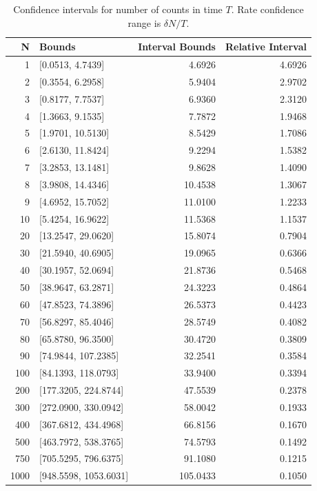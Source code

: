 \documentclass{article}
\begin{document}
\begin{table}
    \begin{tabular}{r|l|r|r}
     \hline
N & Bounds & Interval Bounds & Relative Interval\\ 
\hline 
1 &  [0.0513, 4.7439] & 4.6926 & 4.6926\\ 
2 &  [0.3554, 6.2958] & 5.9404 & 2.9702\\ 
3 &  [0.8177, 7.7537] & 6.9360 & 2.3120\\ 
4 &  [1.3663, 9.1535] & 7.7872 & 1.9468\\ 
5 &  [1.9701, 10.5130] & 8.5429 & 1.7086\\ 
6 &  [2.6130, 11.8424] & 9.2294 & 1.5382\\ 
7 &  [3.2853, 13.1481] & 9.8628 & 1.4090\\ 
8 &  [3.9808, 14.4346] & 10.4538 & 1.3067\\ 
9 &  [4.6952, 15.7052] & 11.0100 & 1.2233\\ 
10 &  [5.4254, 16.9622] & 11.5368 & 1.1537\\ 
20 &  [13.2547, 29.0620] & 15.8074 & 0.7904\\ 
30 & [21.5940, 40.6905] & 19.0965 & 0.6366\\ 
40 & [30.1957, 52.0694] & 21.8736 & 0.5468\\ 
50 & [38.9647, 63.2871] & 24.3223 & 0.4864\\ 
60 & [47.8523, 74.3896] & 26.5373 & 0.4423\\ 
70 & [56.8297, 85.4046] & 28.5749 & 0.4082\\ 
80 & [65.8780, 96.3500] & 30.4720 & 0.3809\\ 
90 & [74.9844, 107.2385] & 32.2541 & 0.3584\\ 
100 & [84.1393, 118.0793] & 33.9400 & 0.3394\\ 
200 & [177.3205, 224.8744] & 47.5539 & 0.2378\\ 
300 & [272.0900, 330.0942] & 58.0042 & 0.1933\\ 
400 & [367.6812, 434.4968] & 66.8156 & 0.1670\\ 
500 & [463.7972, 538.3765] & 74.5793 & 0.1492\\ 
750 & [705.5295, 796.6375] & 91.1080 & 0.1215\\ 
1000 & [948.5598, 1053.6031] & 105.0433 & 0.1050\\ 
\end{tabular}
\caption{Confidence intervals for number of counts in time $T$.  Rate confidence range is $\delta N/T$.}
\label{tab:conf}
\end{table}
\end{document}

